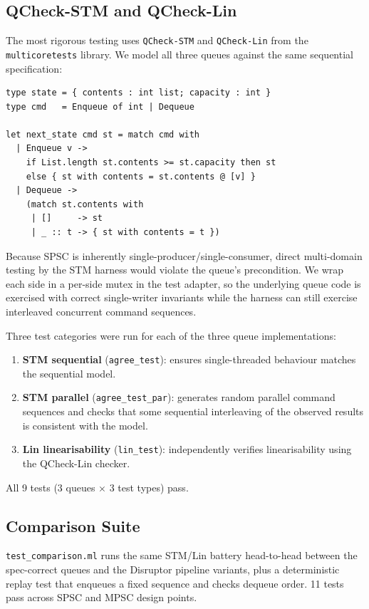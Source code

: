 \documentclass[11pt,a4paper]{article}
\begin{document}
\subsection{QCheck-STM and QCheck-Lin }

The most rigorous testing uses \texttt{QCheck-STM} and \texttt{QCheck-Lin} from
the \texttt{multicoretests} library. We model all three queues against the same
sequential specification:

\begin{lstlisting}[caption={Sequential model shared by all three STM/Lin test suites.}]
type state = { contents : int list; capacity : int }
type cmd   = Enqueue of int | Dequeue

let next_state cmd st = match cmd with
  | Enqueue v ->
    if List.length st.contents >= st.capacity then st
    else { st with contents = st.contents @ [v] }
  | Dequeue ->
    (match st.contents with
     | []     -> st
     | _ :: t -> { st with contents = t })
\end{lstlisting}

Because SPSC is inherently single-producer/single-consumer, direct multi-domain
testing by the STM harness would violate the queue's precondition. We wrap each
side in a per-side mutex in the test adapter, so the underlying queue code is
exercised with correct single-writer invariants while the harness can still
exercise interleaved concurrent command sequences.

Three test categories were run for each of the three queue implementations:
\begin{enumerate}[noitemsep]
  \item \textbf{STM sequential} (\texttt{agree\_test}): ensures single-threaded behaviour matches the sequential model.
  \item \textbf{STM parallel} (\texttt{agree\_test\_par}): generates random parallel command sequences and checks that some sequential interleaving of the observed results is consistent with the model.
  \item \textbf{Lin linearisability} (\texttt{lin\_test}): independently verifies linearisability using the QCheck-Lin checker.
\end{enumerate}
All 9 tests (3 queues $\times$ 3 test types) pass.

\subsection{Comparison Suite }

\texttt{test\_comparison.ml} runs the same STM/Lin battery head-to-head between the
spec-correct queues and the Disruptor pipeline variants, plus a deterministic replay
test that enqueues a fixed sequence and checks dequeue order. 11 tests pass across
SPSC and MPSC design points.
\end{document}
